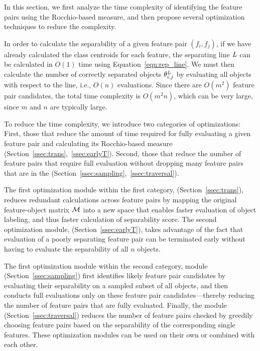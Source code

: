 In this section, we first analyze the time complexity of identifying the \topk feature pairs using the Rocchio-based measure, and then propose several optimization techniques to reduce the complexity.

 In order to calculate the separability of a given feature pair $(f_i, f_j)$, if we have already calculated the class centroids for each feature, the separating line $\mathit{L}$ can be calculated in $O(1)$ time using Equation~\ref{eqn:rep_line}. We must then calculate the number of correctly separated objects $\theta_{i,j}^{\mathit{L}}$ by evaluating all objects with respect to the line, i.e., $O(n)$ evaluations. Since there are $O(m^2)$ feature pair candidates, the total time complexity is $O(m^2n)$, which can be very large,
since $m$ and $n$ are typically large.

 To reduce the time complexity, we introduce two categories of optimizations: First, those that reduce the amount of time required for fully evaluating a given feature pair and calculating its Rocchio-based measure (Section~\ref{ssec:trans},~\ref{ssec:earlyT}). Second, those that reduce the number of feature pairs that require full evaluation without dropping many feature pairs that are in the \topk (Section~\ref{ssec:sampling},~\ref{ssec:traversal}).

The first optimization module within the first category, \trans (Section~\ref{ssec:trans}), reduces redundant calculations across feature pairs by mapping the original feature-object matrix ${\mathcal{M}}$ into a new space that enables faster evaluation of object labeling, and thus faster calculation of separability score. The second optimization module, \earlyT (Section~\ref{ssec:earlyT}), takes advantage of the fact that evaluation of a poorly separating feature pair can be terminated early without having to evaluate the separability of all $n$ objects.

The first optimization module within the second category, \sampling module (Section~\ref{ssec:sampling}) first identifies likely \topk feature pair candidates by evaluating their separability on a sampled subset of all objects, and then conducts full evaluations only on these feature pair candidates---thereby reducing the number of feature pairs that are fully evaluated. Finally, the \traversal module (Section~\ref{ssec:traversal}) reduces the number of feature pairs checked by greedily choosing feature pairs based on the separability of the corresponding single features. These optimization modules can be used on their own or combined with each other.

